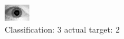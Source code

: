 \begin{figure}[h!]
\begin{center}
\includegraphics[width=0.60\columnwidth]{figures/ID1650_class_3_target_2.png}
\end{center}
\caption{ Classification: 3 actual target: 2}
\label{fig:ID1650_class_3_target_2}
\end{figure}
